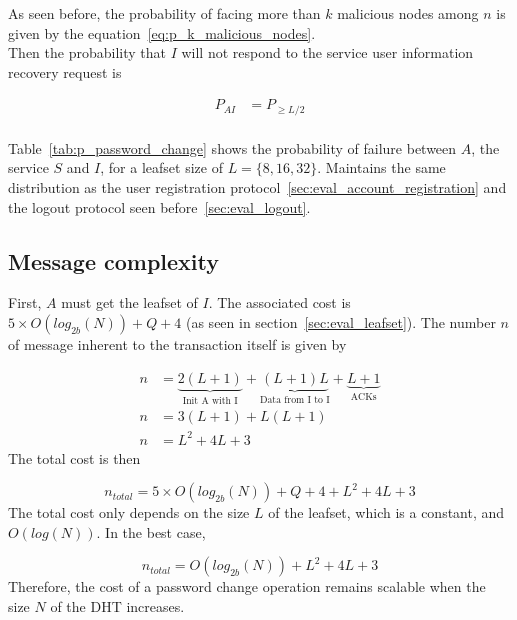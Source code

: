     As seen before, the probability of facing more than $k$ malicious nodes among
$n$ is given by the equation~\ref{eq:p_k_malicious_nodes}.\\

    Then the probability that $I$ will not respond to the service user
information recovery request is

    \begin{align}
      P_{AI} &= P_{\ge L/2} \\
    \end{align}


    Table~\eqref{tab:p_password_change} shows the probability of failure
between $A$, the service $S$ and $I$, for a leafset size of $L = \{8,16,32\}$.
Maintains the same distribution as the user registration
protocol~\ref{sec:eval_account_registration} and the
logout protocol seen before~\ref{sec:eval_logout}.

  \subsection{Message complexity}

    First, $A$ must get the leafset of $I$. The associated cost is $5
\times O(log_{2b}(N)) + Q + 4$ (as seen in section~\ref{sec:eval_leafset}).
    The number $n$ of message inherent to the transaction itself is given by

    \begin{align}
      n &= \underbrace{2(L+1)}_\text{Init A with I} +
           \underbrace{(L+1)L}_\text{Data from I to I} +
           \underbrace{L+1}_\text{ACKs}\\
      n &= 3(L+1) + L(L+1)\\
      n &= L^2 + 4L + 3
    \end{align}
     The total cost is then

    $$
      n_{total} = 5 \times O(log_{2b}(N)) + Q + 4 +  L^2 + 4L + 3
    $$    
    The total cost only depends on the size $L$ of the leafset, which is a
constant, and $O(log(N))$. In the best case, 

    $$
      n_{total} = O(log_{2b}(N)) + L^2 + 4L + 3
    $$
    Therefore, the cost of a password change operation remains
scalable when the size $N$ of the DHT increases.

